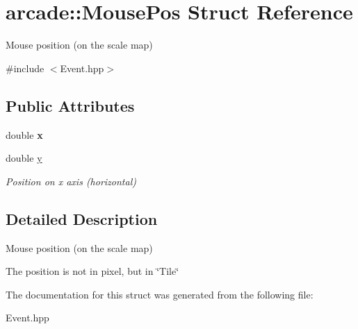 \hypertarget{structarcade_1_1MousePos}{}\section{arcade\+:\+:Mouse\+Pos Struct Reference}
\label{structarcade_1_1MousePos}


Mouse position (on the scale map)  




{\ttfamily \#include $<$Event.\+hpp$>$}

\subsection*{Public Attributes}
\begin{DoxyCompactItemize}
\item 
\mbox{\label{structarcade_1_1MousePos_a0baa5eab2ede9028abdfa46dfbf3b901}} 
double {\bfseries x}
\item 
\mbox{\label{structarcade_1_1MousePos_a6737b813beae9a70aa6f7cbfc90154a6}} 
double \hyperlink{structarcade_1_1MousePos_a6737b813beae9a70aa6f7cbfc90154a6}{y}
\begin{DoxyCompactList}\small\item\em Position on x axis (horizontal) \end{DoxyCompactList}\end{DoxyCompactItemize}


\subsection{Detailed Description}
Mouse position (on the scale map) 

The position is not in pixel, but in \char`\"{}\+Tile\char`\"{} 

The documentation for this struct was generated from the following file\+:\begin{DoxyCompactItemize}
\item 
Event.\+hpp\end{DoxyCompactItemize}
